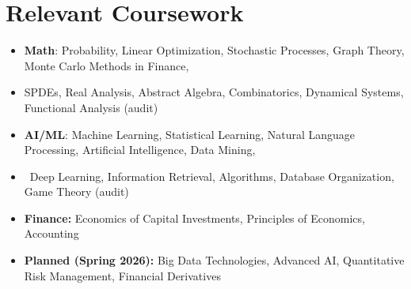 \documentclass[letterpaper,10pt]{article}
\newcommand\vspacesize{-10pt}
\newcommand{\resumeSubHeadingListStart}{\begin{itemize}[leftmargin=0.15in, label=]}
\newcommand{\resumeSubHeadingListEnd}{\end{itemize}}
\begin{document}
\vspace{\vspacesize}

\section{Relevant Coursework}
\resumeSubHeadingListStart
    \item \textbf{Math}: Probability, Linear Optimization, Stochastic Processes, Graph Theory, Monte Carlo Methods in Finance, \vspace{-5pt}
    \item \qquad\quad\;\! SPDEs, Real Analysis, Abstract Algebra, Combinatorics, Dynamical Systems, Functional Analysis (audit) \vspace{-5pt}
    \item \textbf{AI/ML}: Machine Learning, Statistical Learning, Natural Language Processing, Artificial Intelligence, Data Mining, \vspace{-5pt}
    \item \qquad\qquad\ Deep Learning, Information Retrieval, Algorithms, Database Organization, Game Theory (audit) \vspace{-5pt}
    \item \textbf{Finance:} Economics of Capital Investments, Principles of Economics, Accounting \vspace{-5pt}
    \item \textbf{Planned (Spring 2026):} Big Data Technologies, Advanced AI, Quantitative Risk Management, Financial Derivatives \vspace{-5pt}
\resumeSubHeadingListEnd
\end{document}
